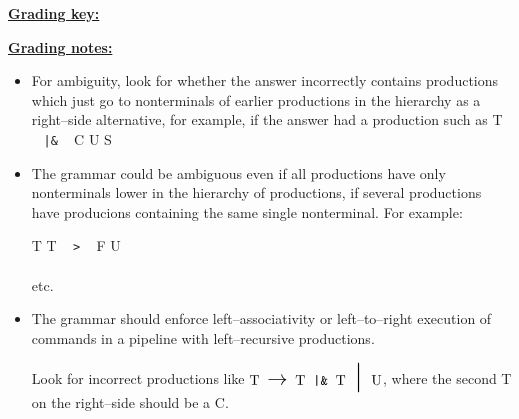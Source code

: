 \documentclass[11pt,fleqn]{article}
\begin{document}
\begin{enumerate}
\begin{info}{\textbf{\underline{Grading key:}}}
          \end{info}

          \begin{info}{\textbf{\underline{Grading notes:}}}

            \begin{itemize}

              \addtolength{\itemsep}{2mm}

              \item For ambiguity, look for whether the answer
                    incorrectly contains productions which just go to
                    nonterminals of earlier productions in the hierarchy as a
                    right--side alternative, for example, if the answer had a
                    production such as \hspace{2mm}
                               {T \ \: \texttt{|\&} \ \: C \midspc U \midspc S}

              \item The grammar could be ambiguous even if all productions
                    have only nonterminals lower in the hierarchy of
                    productions, if several productions have producions
                    containing the same single nonterminal.  For example:

                    \vspace{-1mm}

                    \hspace{.25in}
                    \begin{grammar}

                                 {T \midspc T \ \: \texttt{>} \ \: F \midspc U}
                      \\

                      \\

                      \textrm{etc.}

                    \end{grammar}

              \item The grammar should enforce left--associativity or
                    left--to--right execution of commands in a pipeline with
                    left--recursive productions.

                    Look for incorrect productions like
                    \(
                      \mathrm{
                      \production{T}{T \ \: \texttt{|\&} \ \: T \midspc U}
                      }
                    \), where the second T on the right--side should be a C.


\end{itemize}
\end{info}
\end{enumerate}
\end{document}
